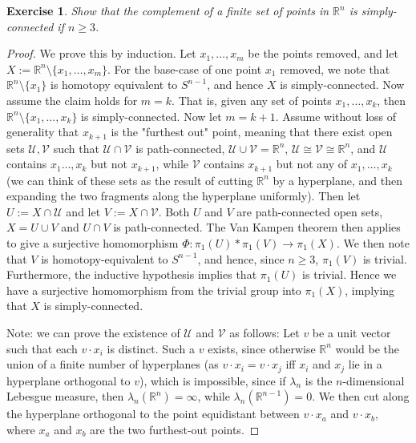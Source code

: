 \documentclass{article}
\newtheorem{exercise}{Exercise}[subsection]
\begin{document}
\begin{exercise}
Show that the complement of a finite set of points in $\mathbb{R}^n$ is simply-connected if $n\geq 3$.
\end{exercise}
\begin{proof}
We prove this by induction. Let $x_1,\dots,x_m$ be the points removed, and let $X:=\mathbb{R}^n\setminus\{x_1,\dots,x_m\}$. For the base-case of one point $x_1$ removed, we note that $\mathbb{R}^n\setminus\{x_1\}$ is homotopy equivalent to $S^{n-1}$, and hence $X$ is simply-connected. Now assume the claim holds for $m=k$. That is, given any set of points $x_1,\dots,x_k$, then $\mathbb{R}^n\setminus\{x_1,\dots,x_k\}$ is simply-connected. Now let $m=k+1$. Assume without loss of generality that $x_{k+1}$ is the "furthest out" point, meaning that there exist open sets $\mathcal{U},\mathcal{V}$ such that $\mathcal{U}\cap\mathcal{V}$ is path-connected, $\mathcal{U}\cup\mathcal{V}=\mathbb{R}^n$, $\mathcal{U}\cong\mathcal V\cong\mathbb{R}^n$, and $\mathcal{U}$ contains $x_1\dots,x_k$ but not $x_{k+1}$, while $\mathcal{V}$ contains $x_{k+1}$ but not any of $x_1,\dots,x_k$  (we can think of these sets as the result of cutting $\mathbb{R}^n$ by a hyperplane, and then expanding the two fragments along the hyperplane uniformly). Then let $U:=X\cap\mathcal{U}$ and let $V:=X\cap\mathcal{V}$. Both $U$ and $V$ are path-connected open sets, $X=U\cup V$ and $U\cap V$ is path-connected. The Van Kampen theorem then applies to give a surjective homomorphism $\Phi:\pi_1(U)*\pi_1(V)\to\pi_1(X)$. We then note that $V$ is homotopy-equivalent to $S^{n-1}$, and hence, since $n\geq 3$, $\pi_1(V)$ is trivial. Furthermore, the inductive hypothesis implies that $\pi_1(U)$ is trivial. Hence we have a surjective homomorphism from the trivial group into $\pi_1(X)$, implying that $X$ is simply-connected.

Note: we can prove the existence of $\mathcal{U}$ and $\mathcal{V}$ as follows: Let $v$ be a unit vector such that each $v\cdot x_i$ is distinct. Such a $v$ exists, since otherwise $\mathbb{R}^n$ would be the union of a finite number of hyperplanes (as $v\cdot x_i=v\cdot x_j$ iff $x_i$ and $x_j$ lie in a hyperplane orthogonal to $v$), which is impossible, since if $\lambda_n$ is the $n$-dimensional Lebesgue measure, then $\lambda_n(\mathbb{R}^n)=\infty$, while $\lambda_n(\mathbb{R}^{n-1})=0$. We then cut along the hyperplane orthogonal to the point equidistant between $v\cdot x_a$ and $v\cdot x_b$, where $x_a$ and $x_b$ are the two furthest-out points.
\end{proof}
\end{document}
